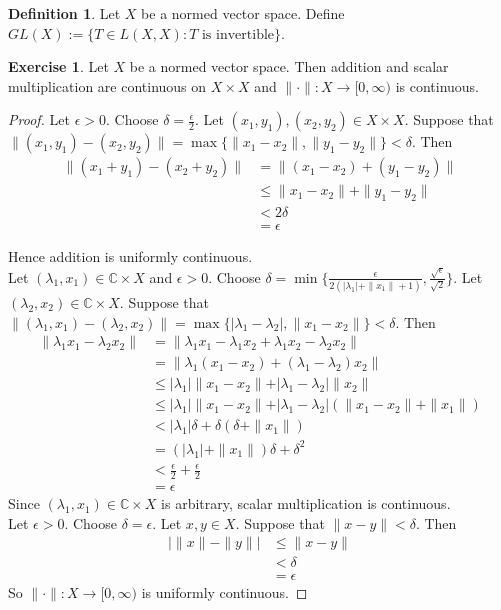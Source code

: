 \documentclass[12pt]{amsart}
\theoremstyle{definition}
\newtheorem{defn}[definition]{Definition}
\theoremstyle{remark}
\theoremstyle{definition}
\newtheorem{ex}[definition]{Exercise}
\newcommand{\del}{\delta}
\newcommand{\lam}{\lambda}
\newcommand{\ep}{\epsilon}
\newcommand{\C}{\mathbb{C}}
\newcommand{\Rg}{[0,\infty)}
\begin{document}
	\begin{defn}
		Let $X$ be a normed vector space. Define $GL(X) := \{T \in L(X,X): T \text{ is invertible}\}$.
	\end{defn}
	
	\begin{ex}
		Let $X$ be a normed vector space. Then addition and scalar multiplication are continuous on $X \times X$ and $\|\cdot \|:X \rightarrow \Rg$ is continuous.
	\end{ex}
	
	\begin{proof}
		Let $\ep > 0$. Choose $\del = \frac{\ep}{2}$. Let $(x_1,y_1), (x_2,y_2) \in X \times X$. Suppose that $\|(x_1,y_1)-(x_2,y_2) \| = \max\{\|x_1-x_2 \|, \|y_1 - y_2 \|\} < \del$. Then 
		\begin{align*}
			\|(x_1 + y_1) - (x_2+y_2) \|
			&= \|(x_1-x_2) + (y_1-y_2) \|\\
			& \leq \| x_1-x_2 \|+ \|y_1-y_2 \|\\
			& < 2\del \\
			&= \ep
		\end{align*} 
		
		Hence addition is uniformly continuous. \vspace{1cm}\\ Let $(\lam_1,x_1) \in \C \times X$ and $\ep >0$. Choose $\del = \min\{\frac{\ep}{2(\vert \lam_1 \vert + \|x_1 \|+ 1)}, \frac{\sqrt{\ep}}{\sqrt{2}}\}$. Let $(\lam_2, x_2) \in \C \times X$. Suppose that $\|(\lam_1, x_1)-(\lam_2,x_2) \| = \max\{\vert \lam_1-\lam_2 \vert , \|x_1 - x_2 \|\} < \del$. Then 
		\begin{align*}
			\|\lam_1x_1 - \lam_2x_2 \|
			&= \|\lam_1x_1 - \lam_1x_2 + \lam_1x_2- \lam_2x_2 \|\\
			&= \|\lam_1(x_1-x_2) + (\lam_1-\lam_2)x_2 \|\\
			& \leq \vert \lam_1 \vert \| x_1-x_2 \|+ \vert \lam_1-\lam_2 \vert \|x_2\|\\
			& \leq \vert \lam_1 \vert  \| x_1-x_2 \|+ \vert \lam_1-\lam_2 \vert (\|x_1 -x_2\|+ \|x_1\|)\\
			& < \vert \lam_1 \vert \del  +  \del( \del + \|x_1 \|)\\
			&= (\vert \lam_1 \vert + \|x_1 \|) \del + \del^2 \\
			&< \frac{\ep}{2}+ \frac{\ep}{2}\\
			&= \ep
		\end{align*}
		Since $(\lam_1, x_1) \in \C \times X$ is arbitrary, scalar multiplication is continuous. \vspace{1cm} \\ Let $\ep > 0$. Choose $\del = \ep$. Let $x,y \in X$. Suppose that $\|x-y \|< \del$. Then 
		\begin{align*}
			\big \vert \|x \|- \|y \|\big  \vert
			& \leq \|x - y \|\\
			&< \del\\
			&=\ep
		\end{align*}  
		So $\|\cdot \|: X \rightarrow \Rg$ is uniformly continuous.
	\end{proof}
	
\end{document}
